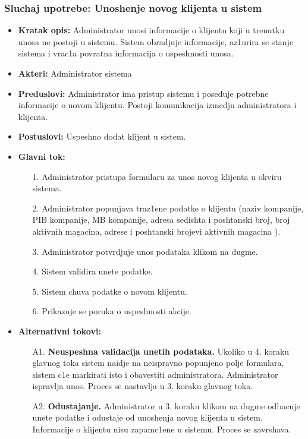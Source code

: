 \subsubsection{Sluchaj upotrebe: Unoshenje novog klijenta u sistem}
\begin{itemize}
\item{\textbf{Kratak opis:} Administrator unosi informacije o klijentu koji u trenutku unosa ne postoji u sistemu. Sistem obradjuje informacije, az1urira se stanje sistema i vrac1a povratna informacija o uspeshnosti unosa.}
\item{\textbf{Akteri:} Administrator sistema}

\item{\textbf{Preduslovi:} Administrator ima pristup sistemu i poseduje potrebne informacije o novom klijentu. Postoji komunikacija izmedju administratora i klijenta. }
\item{\textbf{Postuslovi:} Uspeshno dodat klijent u sistem.}
\item{\textbf{Glavni tok:} 
\begin{enumerate}
    \item [1.] Administrator pristupa formularu za unos novog klijenta u okviru sistema.
    \item[2.] Administrator popunjava traz1ene podatke o klijentu (naziv kompanije, PIB kompanije, MB kompanije, adresa sedishta i poshtanski broj, broj aktivnih magacina, adrese i poshtanski brojevi aktivnih magacina ).
    \item[3.] Administrator potvrdjuje unos podataka klikom na dugme.
    \item[4.] Sistem validira unete podatke.
    \item[5.] Sistem chuva podatke o novom klijentu.
    \item[6.] Prikazuje se poruka o uspeshnosti akcije.
\end{enumerate}

}
\item{\textbf{Alternativni tokovi:} 
\begin{enumerate}
    \item [A1.] \textbf{Neuspeshna validacija unetih podataka.} Ukoliko u 4. koraku glavnog toka sistem naidje na neispravno popunjeno polje formulara, sistem c1e markirati isto i obavestiti administratora. Administrator ispravlja unos. Proces se nastavlja u 3. koraku glavnog toka.
    \item[A2.] \textbf{Odustajanje.} Administrator u 3. koraku klikom na dugme odbacuje unete podatke i odustaje od unoshenja novog klijenta u sistem. Informacije o klijentu nisu zapamc1ene u sistemu. Proces se zavrshava.
\end{enumerate}
}
\end{itemize}

